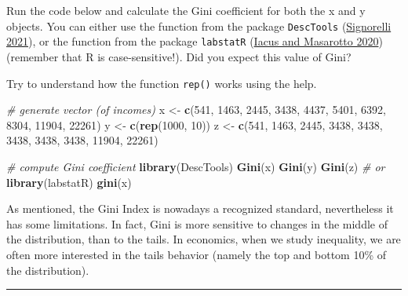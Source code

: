 \documentclass[
]{svmono}
\newenvironment{Shaded}{\begin{snugshade}}{\end{snugshade}}
\newcommand{\CommentTok}[1]{\textcolor[rgb]{0.56,0.35,0.01}{\textit{#1}}}
\newcommand{\DecValTok}[1]{\textcolor[rgb]{0.00,0.00,0.81}{#1}}
\newcommand{\FunctionTok}[1]{\textcolor[rgb]{0.13,0.29,0.53}{\textbf{#1}}}
\newcommand{\NormalTok}[1]{#1}
\newcommand{\OtherTok}[1]{\textcolor[rgb]{0.56,0.35,0.01}{#1}}
\begin{document}
Run the code below and calculate the Gini coefficient for both the x and
y objects. You can either use the function from the package \texttt{DescTools}
(\protect\hyperlink{ref-signorelli2021}{Signorelli 2021}), or the function from the package \texttt{labstatR}
(\protect\hyperlink{ref-iacus2020}{Iacus and Masarotto 2020}) (remember that R is case-sensitive!). Did you expect this
value of Gini?

Try to understand how the function \texttt{rep()} works using the help.

\begin{Shaded}
\begin{Highlighting}[]
\CommentTok{\# generate vector (of incomes)}
\NormalTok{x }\OtherTok{\textless{}{-}} \FunctionTok{c}\NormalTok{(}\DecValTok{541}\NormalTok{, }\DecValTok{1463}\NormalTok{, }\DecValTok{2445}\NormalTok{, }\DecValTok{3438}\NormalTok{, }\DecValTok{4437}\NormalTok{, }\DecValTok{5401}\NormalTok{, }\DecValTok{6392}\NormalTok{, }\DecValTok{8304}\NormalTok{, }\DecValTok{11904}\NormalTok{, }\DecValTok{22261}\NormalTok{)}
\NormalTok{y }\OtherTok{\textless{}{-}} \FunctionTok{c}\NormalTok{(}\FunctionTok{rep}\NormalTok{(}\DecValTok{1000}\NormalTok{, }\DecValTok{10}\NormalTok{))}
\NormalTok{z }\OtherTok{\textless{}{-}} \FunctionTok{c}\NormalTok{(}\DecValTok{541}\NormalTok{, }\DecValTok{1463}\NormalTok{, }\DecValTok{2445}\NormalTok{, }\DecValTok{3438}\NormalTok{, }\DecValTok{3438}\NormalTok{, }\DecValTok{3438}\NormalTok{, }\DecValTok{3438}\NormalTok{, }\DecValTok{3438}\NormalTok{, }\DecValTok{11904}\NormalTok{, }\DecValTok{22261}\NormalTok{)}

\CommentTok{\# compute Gini coefficient}
\FunctionTok{library}\NormalTok{(DescTools)}
\FunctionTok{Gini}\NormalTok{(x)}
\FunctionTok{Gini}\NormalTok{(y)}
\FunctionTok{Gini}\NormalTok{(z)}
\CommentTok{\# or}
\FunctionTok{library}\NormalTok{(labstatR)}
\FunctionTok{gini}\NormalTok{(x)}
\end{Highlighting}
\end{Shaded}

As mentioned, the Gini Index is nowadays a recognized standard,
nevertheless it has some limitations. In fact, Gini is more sensitive to
changes in the middle of the distribution, than to the tails. In
economics, when we study inequality, we are often more interested in the
tails behavior (namely the top and bottom 10\% of the distribution).

\begin{center}\rule{0.5\linewidth}{0.5pt}\end{center}
\end{document}
